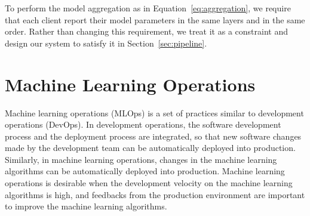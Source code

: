 To perform the model aggregation as in Equation~\ref{eq:aggregation},
we require that each client report their model parameters in the same layers and
in the same order. Rather than changing this requirement,
we treat it as a constraint and design our system to satisfy it in
Section~\ref{sec:pipeline}.

\section{Machine Learning Operations}

Machine learning operations (MLOps) is a set of practices similar to
development operations (DevOps).
In development operations,
the software development process and the deployment process are integrated,
so that new software changes made by the development team can be
automatically deployed into production.
Similarly, in machine learning operations,
changes in the machine learning algorithms can be automatically deployed into
production.
Machine learning operations is desirable when the development velocity on
the machine learning algorithms is high,
and feedbacks from the production environment are important to improve
the machine learning algorithms.

